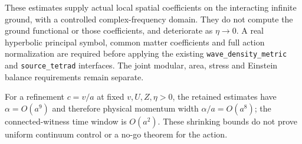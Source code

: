 These estimates supply actual local spatial coefficients on the
interacting infinite ground, with a controlled complex-frequency
domain.  They do not compute the ground functional or those coefficients,
and deteriorate as $\eta\to0$.  A real hyperbolic principal symbol,
common matter coefficients and full action normalization are
required before applying the existing \texttt{wave\_density\_metric}
and \texttt{source\_tetrad} interfaces.  The joint modular, area,
stress and Einstein balance requirements remain separate.

For a refinement $c=v/a$ at fixed $v,U,Z,\eta>0$, the retained estimates
have $\alpha=O(a^9)$ and therefore physical momentum width
$\alpha/a=O(a^8)$; the connected-witness time window is $O(a^2)$.
These shrinking bounds do not prove uniform continuum control or a
no-go theorem for the action.
